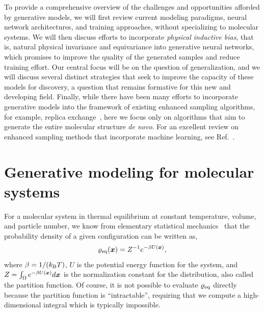 \documentclass[11pt]{article}
\begin{document}
To provide a comprehensive overview of the challenges and opportunities afforded by generative models, we will first review current modeling paradigms, neural network architectures, and training approaches, without specializing to molecular systems. 
We will then discuss efforts to incorporate \emph{physical inductive bias}, that is, natural physical invariance and equivariance into generative neural networks, which promises to improve the quality of the generated samples and reduce training effort.
Our central focus will be on the question of generalization, and we will discuss several distinct strategies that seek to improve the capacity of these models for discovery, a question that remains formative for this new and developing field.
Finally, while there have been many efforts to incorporate generative models into the framework of existing enhanced sampling algorithms, for example, replica exchange~\cite{invernizzi_skipping_2022, wang_data_2022}, here we focus only on algorithms that aim to generate the entire molecular structure \emph{de novo}.
For an excellent review on enhanced sampling methods that incorporate machine learning, see Ref.~\cite{mehdi_enhanced_2023}.


\section{Generative modeling for molecular systems}

For a molecular system in thermal equilibrium at constant temperature, volume, and particle number, we know from elementary statistical mechanics~\cite{chandler_introduction_1987} that the probability density of a given configuration can be written as,
\begin{equation}
    \varrho_{\rm eq}(\boldsymbol{x}) = Z^{-1} e^{-\beta U(\boldsymbol{x})},
    \label{eq:rhoeq}
\end{equation}
where $\beta=1/(k_{\rm B} T)$, $U$ is the potential energy function for the system, and $Z = \int_{\Omega} e^{-\beta U(\boldsymbol{x})} d\boldsymbol{x}$ is the normalization constant for the distribution, also called the partition function. 
Of course, it is not possible to evaluate $\varrho_{\rm eq}$ directly because the partition function is ``intractable'', requiring that we compute a high-dimensional integral which is typically impossible.
\end{document}
